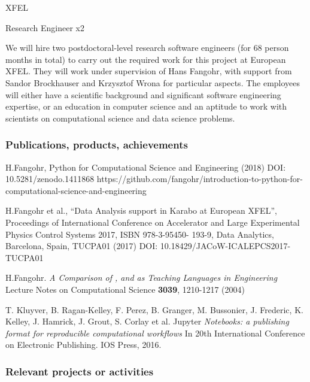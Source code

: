 \begin{sitedescription}{XFEL}
\begin{participant}[PM=68, type=R]{Research Engineer x2}

We will hire two postdoctoral-level research software engineers (for 68 person
months in total) to carry out the required work for this project at
European XFEL. They will work under supervision of Hans Fangohr, with
support from Sandor Brockhauser and Krzysztof Wrona for particular
aspects. The employees will either have a scientific background and
significant software engineering expertise, or an education in
computer science and an aptitude to work with scientists on
computational science and data science problems.
\end{participant}

\subsubsection*{Publications, products, achievements}

\begin{compactenum}
\item H.Fangohr, Python for Computational Science and Engineering
  (2018) DOI: 10.5281/zenodo.1411868 \newline
  https://github.com/fangohr/introduction-to-python-for-computational-science-and-engineering
\item H.Fangohr et al., “Data Analysis support in Karabo at European
  XFEL”, Proceedings of International Conference on Accelerator and
  Large Experimental Physics Control Systems 2017, ISBN 978-3-95450-
  193-9, Data Analytics, Barcelona, Spain, TUCPA01 (2017) DOI: 10.18429/JACoW-ICALEPCS2017-TUCPA01
\item H.Fangohr.
\emph{A Comparison of , \Matlab and \Python as Teaching Languages in Engineering}
Lecture Notes on Computational Science \textbf{3039}, 1210-1217 (2004)
\item T. Kluyver, B. Ragan-Kelley, F. Perez, B. Granger, M. Bussonier, J. Frederic, K. Kelley, J. Hamrick, J. Grout, S. Corlay et al. Jupyter
\emph{Notebooks: a publishing format for reproducible computational workflows} In 20th International Conference on Electronic Publishing. IOS Press, 2016.
\end{compactenum}

\subsubsection*{Relevant projects or activities}


\end{sitedescription}
